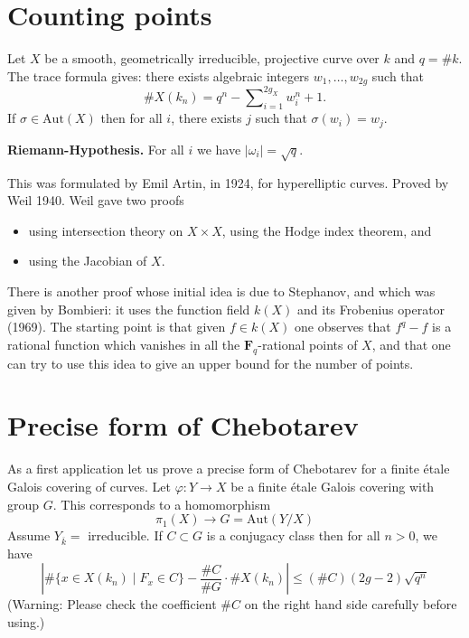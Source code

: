 \section{Counting points}
\label{section-counting}

\noindent
Let $X$ be a smooth, geometrically irreducible,
projective curve over $k$ and $q = \# k$. The trace formula gives:
there exists algebraic integers $w_1, \ldots, w_{2g}$ such that
$$
\# X(k_n) = q^n - \sum\nolimits_{i = 1}^{2g_X} w_i^n + 1.
$$
If $\sigma\in \text{Aut}(X)$ then for all $i$, there exists $j$ such that
$\sigma(w_i)=w_j$.

\medskip\noindent
{\bf Riemann-Hypothesis.} For all $i$ we have $|\omega_i| = \sqrt{q}$.

\medskip\noindent
This was formulated by Emil Artin, in 1924, for
hyperelliptic curves. Proved by Weil 1940. Weil gave two proofs
\begin{itemize}
\item using intersection theory on $X \times X$, using the
Hodge index theorem, and
\item using the Jacobian of $X$.
\end{itemize}
There is another proof whose initial idea is due to Stephanov, and
which was given by Bombieri: it uses the function field $k(X)$ and
its Frobenius operator (1969). The starting point is that given
$f\in k(X)$ one observes that $f^q - f$ is a rational function which
vanishes in all the $\mathbf{F}_q$-rational points of $X$, and that one
can try to use this idea to give an upper bound for the number of points.


\section{Precise form of Chebotarev}
\label{section-chebotarev}

\noindent
As a first application let us prove a precise form of Chebotarev
for a finite \'etale Galois covering of curves.
Let $\varphi : Y \to X$ be a finite \'etale Galois covering with
group $G$. This corresponds to a homomorphism
$$
\pi_1(X) \longrightarrow G = \text{Aut}(Y/X)
$$
Assume $Y_{\overline{k}} = $ irreducible. If $C\subset G$ is a conjugacy
class then for all $n > 0$, we have
$$
| \# \{x \in X(k_n) \mid F_x \in C\} - \frac{\# C}{\# G} \cdot \# X(k_n) |
\leq
(\# C)(2g - 2) \sqrt{q^n}
$$
(Warning: Please check the coefficient $\# C$ on the right hand side
carefully before using.)


